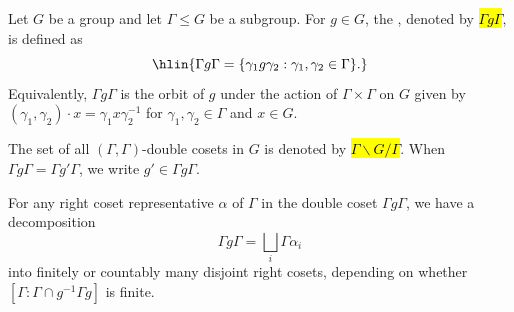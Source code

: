 \begin{definition} \label{definition:double_coset_of_a_subgroup_in_a_group}
Let $G$ be a group and let $\Gamma \leq G$ be a subgroup. For $g \in G$, the , denoted by \hl{$\Gamma g \Gamma$}, is defined as
$$\hlin{\Gamma g \Gamma = \{ \gamma_1 g \gamma_2 : \gamma_1, \gamma_2 \in \Gamma \}.}$$
Equivalently, $\Gamma g \Gamma$ is the orbit of $g$ under the action of $\Gamma \times \Gamma$ on $G$ given by $(\gamma_1, \gamma_2) \cdot x = \gamma_1 x \gamma_2^{-1}$ for $\gamma_1, \gamma_2 \in \Gamma$ and $x \in G$.

The set of all $(\Gamma,\Gamma)$-double cosets in $G$ is denoted by \hl{$\Gamma \backslash G / \Gamma$}. When $\Gamma g \Gamma = \Gamma g' \Gamma$, we write $g' \in \Gamma g \Gamma$.

For any right coset representative $\alpha$ of $\Gamma$ in the double coset $\Gamma g \Gamma$, we have a decomposition
$$\Gamma g \Gamma = \bigsqcup_{i} \Gamma \alpha_i$$
into finitely or countably many disjoint right cosets, depending on whether $[\Gamma : \Gamma \cap g^{-1}\Gamma g]$ is finite.

\end{definition}

